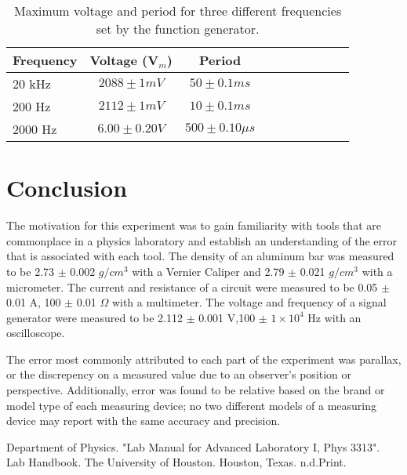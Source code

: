 \documentclass[twoside,10pt]{article}
\begin{document}
\begin{multicols}{2}
	\begin{table}[H]
	\centering
	\begin{tabular}{l c c rrrrrrr}
		\hline \hline
		 Frequency & Voltage (V$_m$) & Period \\ [1ex]
		\hline
		20 kHz & $2088 \pm 1 mV$ & $50 \pm 0.1 ms$ \\ [1.5ex]
		200 Hz & $2112 \pm 1 mV$ & $10 \pm 0.1 ms$  \\ [1.5ex]
		2000 Hz & $6.00 \pm 0.20 V$ & $500 \pm 0.10 \mu s$ \\ [1.5ex]
		\hline
	\end{tabular}
	\caption{Maximum voltage and period for three different frequencies set by the function generator.}
\end{table}
		
		\section{Conclusion}
		
		The motivation for this experiment was to gain familiarity with tools that are commonplace in a physics laboratory and establish an understanding of the error that is associated with each tool. The density of an aluminum bar was measured to be 2.73 $\pm$ 0.002 $g/cm^3$ with a Vernier Caliper and 2.79 $\pm$ 0.021 $g/cm^3$ with a micrometer. The current and resistance of a circuit were measured to be 0.05 $\pm$ 0.01 A, 100 $\pm$ 0.01 $\Omega$ with a multimeter. The voltage and frequency of a signal generator were measured to be 2.112 $\pm$ 0.001 V,100 $\pm$ $1 \times10^4$ Hz with an oscilloscope. 
		
		\indent The error most commonly attributed to each part of the experiment was parallax, or the discrepency on a measured value due to an observer's position or perspective. Additionally, error was found to be relative based on the brand or model type of each measuring device; no two different models of a measuring device may report with the same accuracy and precision. 
		
		
		
		
		\begin{thebibliography}{99} %
	
	Department of Physics. "Lab Manual for Advanced Laboratory I, Phys 3313". Lab Handbook. The University of Houston. Houston, Texas. n.d.Print.
	

	
\end{thebibliography}
		
		
	\end{multicols}
	
\end{document}
